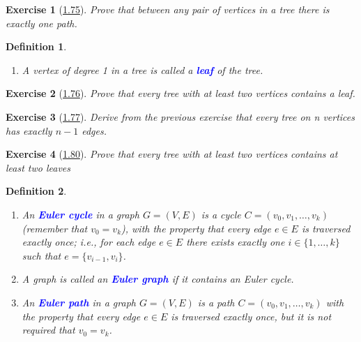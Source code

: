 \documentclass[10pt]{report}
\numberwithin{dummy}{section}
\theoremstyle{ocrenumbox}
\newtheorem{definitionT}{Exercise}[]
\theoremstyle{grayman}
\newtheorem{definitionTTTT}{Definition}[]
\newenvironment{exo}{\begin{dBox}\begin{definitionT}}{\end{definitionT}\end{dBox}}
\newenvironment{voc}{\begin{vBox}\begin{definitionTTTT}}{\end{definitionTTTT}\end{vBox}}
\begin{document}
\begin{exo}[\hypertarget{exo175}{\hyperlink{so175}{1.75}}] 
Prove that between any pair of vertices in a tree there is
exactly one path.
\end{exo}
\begin{voc}{}{}\leavevmode
\begin{enumerate}
    \item A vertex of degree 1 in a tree is called a \textbf{\textcolor{blue}{leaf}} of the tree.
\end{enumerate}
\end{voc}

\begin{exo}[\hypertarget{exo176}{\hyperlink{so176}{1.76}}] 
Prove that every tree with at least two vertices contains a leaf.
\end{exo}
\begin{exo}[\hypertarget{exo177}{\hyperlink{so177}{1.77}}] 
Derive from the previous exercise that every tree on n vertices has exactly $n - 1$ edges.
\end{exo}

\begin{exo}[\hypertarget{exo180}{\hyperlink{so180}{1.80}}] 
Prove that every tree with at least two vertices contains at
least two leaves
\end{exo}
\begin{voc}{}{}\leavevmode
\begin{enumerate}
    \item An \textbf{\textcolor{blue}{Euler cycle}} in a graph $G = (V, E)$ is a cycle $C = (v_0, v_1, \dots , v_k)$ (remember that $v_0 = v_k$), with the property that every edge $e \in E$ is traversed exactly once; i.e., for each edge $e \in E$ there exists exactly one
$i \in \{1, \dots , k\}$ such that $e = \{v_{i-1}, v_i\}$. 
    \item A graph is called an \textbf{\textcolor{blue}{Euler graph}} if it contains an Euler cycle. 
    \item An \textbf{\textcolor{blue}{Euler path}} in a graph $G = (V, E)$ is a path $C = (v_0, v_1, \dots , v_k)$ with the property that every edge $e \in E$ is traversed exactly once, but it is not required that $v_0 = v_k$.
\end{enumerate}
\end{voc}
\end{document}
